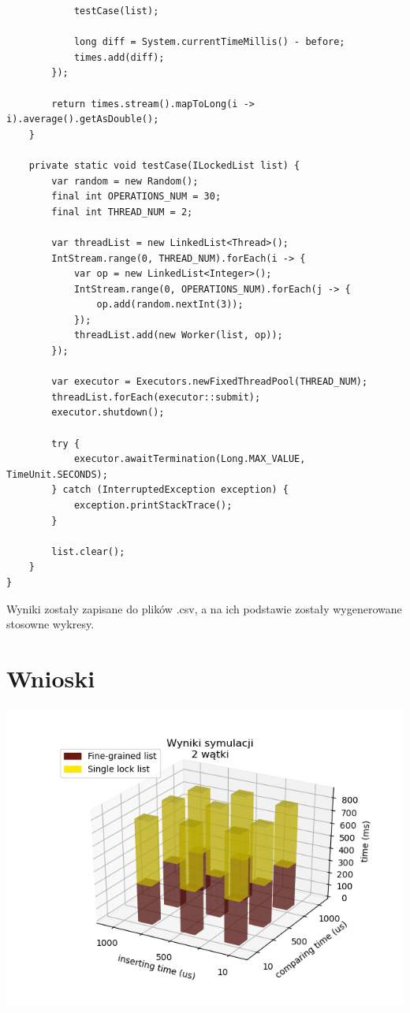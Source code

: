 \documentclass[12pt]{article}
\begin{document}
\begin{verbatim}
            testCase(list);

            long diff = System.currentTimeMillis() - before;
            times.add(diff);
        });

        return times.stream().mapToLong(i -> i).average().getAsDouble();
    }

    private static void testCase(ILockedList list) {
        var random = new Random();
        final int OPERATIONS_NUM = 30;
        final int THREAD_NUM = 2;

        var threadList = new LinkedList<Thread>();
        IntStream.range(0, THREAD_NUM).forEach(i -> {
            var op = new LinkedList<Integer>();
            IntStream.range(0, OPERATIONS_NUM).forEach(j -> {
                op.add(random.nextInt(3));
            });
            threadList.add(new Worker(list, op));
        });

        var executor = Executors.newFixedThreadPool(THREAD_NUM);
        threadList.forEach(executor::submit);
        executor.shutdown();

        try {
            executor.awaitTermination(Long.MAX_VALUE, TimeUnit.SECONDS);
        } catch (InterruptedException exception) {
            exception.printStackTrace();
        }

        list.clear();
    }
}
\end{verbatim}

Wyniki zostały zapisane do plików .csv, a na ich podstawie zostały wygenerowane stosowne wykresy.


\section{Wnioski}
\begin{center}
\centering
    \includegraphics{chart_results_lists_2_threads.png}
\end{center}
\end{document}
